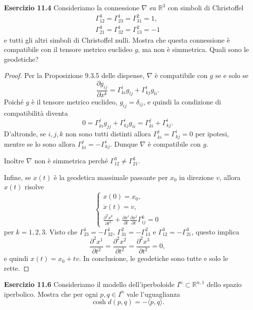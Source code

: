 \documentclass[a4paper]{article}
\newcommand{\R}{\mathbb{R}}
\theoremstyle{definition}
\theoremstyle{definition}
\theoremstyle{remark}
\theoremstyle{definition}
\begin{document}
\textbf{Esercizio 11.4}
Consideriamo la connessione $\nabla$ su $\R^3$ con simboli di Christoffel
\begin{align*}
    \Gamma^3_{12} = \Gamma^1_{23} = \Gamma^2_{31} = 1, \\
    \Gamma^3_{21} = \Gamma^1_{32} = \Gamma^2_{13} = -1
\end{align*}
e tutti gli altri simboli di Christoffel nulli. Mostra che questa connessione è compatibile con il tensore metrico euclideo $g$, ma non è simmetrica. Quali sono le geodetiche?
\begin{proof}
Per la Proposizione 9.3.5 delle dispense, $\nabla$ è compatibile con $g$ se e solo se
\[
    \frac{\partial g_{ij}}{\partial x^k} = \Gamma^l_{ki} g_{lj} + \Gamma^l_{kj} g_{li}
.\]
Poiché $g$ è il tensore metrico euclideo, $g_{ij} = \delta_{ij}$, e quindi la condizione di compatibilità diventa
\[
    0 = \Gamma^j_{ki}g_{jj} + \Gamma^i_{kj}g_{ii}=\Gamma^j_{ki}+\Gamma^i_{kj}
.\]
D'altronde, se $i,j,k$ non sono tutti distinti allora $\Gamma^j_{ki}=\Gamma^i_{kj}=0$ per ipotesi, mentre se lo sono allora
$\Gamma^j_{ki}=-\Gamma^i_{kj}$. Dunque $\nabla$ è compatibile con $g$.

Inoltre $\nabla$ non è simmetrica perché $\Gamma^3_{12} \neq \Gamma^3_{21}$.

Infine, se $x(t)$ è la geodetica massimale passante per $x_0$ in direzione $v$, allora $x(t)$ risolve
\[
\begin{cases}
x(0) = x_0, \\
\dot{x}(t) = v, \\
\frac{\partial^2x^k}{\partial t^2} + \frac{\partial x^i}{\partial t}\frac{\partial x^j}{\partial t}\Gamma^k_{ij} = 0
\end{cases}
\]
per $k=1,2,3$. Visto che $\Gamma^1_{23} = -\Gamma^1_{32}$, $\Gamma^2_{31} = -\Gamma^2_{13}$ e $\Gamma^3_{12} = -\Gamma^3_{21}$, questo implica \[\frac{\partial^2 x^1}{\partial t^2}
= \frac{\partial^2 x^2}{\partial t^2} = \frac{\partial^2 x^3}{\partial t^2} = 0,\] e quindi $x(t)=x_0+t v$. In conclusione, le geodetiche sono tutte e solo le rette.
\end{proof}

\textbf{Esercizio 11.6}
Consideriamo il modello dell'iperboloide $I^n \subset \R^{n,1}$ dello spazio iperbolico. Mostra che per ogni $p, q \in I^n$ vale l'uguaglianza
\[
    \cosh d(p, q) = -\langle p, q \rangle
.\]
\end{document}
